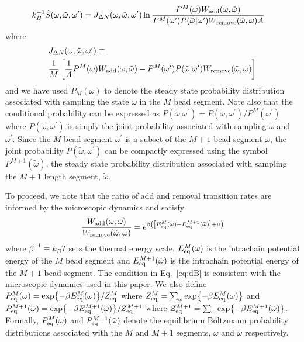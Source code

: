 \documentclass[amsmath,preprintnumbers,10pt,nofootinbib,prl,twocolumn]{revtex4-1}
\begin{document}
\begin{equation}
\label{eq:entprod}
\begin{split}
    &
    k_B^{-1}\dot{S}(\omega,\tilde\omega,\omega^\prime)=J_{\Delta N}(\omega,\tilde\omega,\omega^\prime)\ln\frac{P^M(\omega)W_{\rm add}(\omega,\tilde\omega)}{P^M(\omega^\prime)P(\tilde\omega|\omega^\prime)W_{\rm remove}(\tilde \omega,\omega)A}
\end{split}
\end{equation}
where
\begin{equation}
\begin{split}
    &J_{\Delta N}(\omega,\tilde\omega,\omega^\prime)\equiv\\& \frac{1}{M}\left[\frac{1}{A}P^M(\omega)W_{\rm add}(\omega,\tilde\omega)-P^M(\omega^\prime)P(\tilde\omega|\omega^\prime)W_{\rm remove}(\tilde \omega,\omega)\right]
\end{split}
\end{equation}
and we have used $P_M(\omega)$ to denote the steady state probability distribution associated with sampling the state $\omega$ in the $M$ bead segment. Note also that the conditional probability can be expressed as $P(\tilde \omega|\omega^\prime)=P(\tilde \omega,\omega^\prime)/P^M(\omega^\prime)$ where $P(\tilde \omega,\omega^\prime)$ is simply the joint probability associated with sampling $\tilde \omega$ and $\omega^\prime$. Since the $M$ bead segment $\omega^\prime$ is a subset of the $M+1$ bead segment $\tilde\omega$, the joint probability $P(\tilde \omega,\omega^\prime)$ can be compactly expressed using the symbol $P^{M+1}(\tilde \omega)$, the steady state probability distribution associated with sampling the $M+1$ length segment, $\tilde \omega$. 

To proceed, we note that the ratio of add and removal transition rates are informed by the microscopic dynamics and satisfy 
\begin{equation}
\label{eq:dB}
    \frac{W_{\rm add}(\omega,\tilde\omega)}{W_{\rm remove}(\tilde \omega,\omega)}=e^{\beta\left(\left[E^M_{\rm{eq}}(\omega)-E^{M+1}_{\rm{eq}}(\tilde\omega)\right]+\mu\right)}
\end{equation}
where $\beta^{-1}\equiv k_B T$ sets the thermal energy scale, $E^M_{\rm{eq}}(\omega)$ is the intrachain potential energy of the $M$ bead segment and $E^{M+1}_{\rm{eq}}(\tilde \omega)$ is the intrachain potential energy of the $M+1$ bead segment. The condition in Eq.~\ref{eq:dB} is consistent with the microscopic dynamics used in this paper. We also define $P_{\rm eq}^{M}(\omega)=\exp{-\beta E^M_{\rm{eq}}(\omega)}/Z^M_{\rm eq}$ where $Z^M_{\rm eq}=\sum_{\omega}\exp{-\beta E^M_{\rm{eq}}(\omega)}$ and $P_{\rm eq}^{M+1}(\tilde \omega)=\exp{-\beta E_{\rm eq}^{M+1}(\tilde\omega)}/Z^{M+1}_{\rm eq}$ where $Z^{M+1}_{\rm eq}=\sum_{\tilde\omega}\exp{-\beta E^{M+1}_{\rm eq}(\tilde \omega)}$. Formally, $P_{\rm eq}^M(\omega)$ and $P_{\rm eq}^{M+1}(\tilde \omega)$ denote the equilibrium Boltzmann probability distributions associated with the $M$ and $M+1$ segments, $\omega$ and $\tilde\omega$ respectively. 
\end{document}
